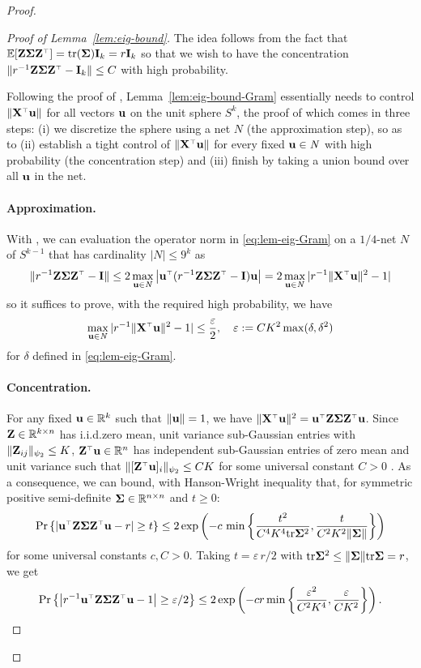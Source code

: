 \documentclass[11pt]{article}
\begin{document}
\begin{proof}
\begin{proof}[Proof of Lemma~\ref{lem:eig-bound}]
The idea follows from the fact that $\E[\Z \Sigmab \Z^\top] = \tr (\Sigmab) \I_k = r \I_k$ so that we wish to have the concentration $\| r^{-1} \Z \Sigmab \Z^\top - \I_k \| \le C$ with high probability.

Following the proof of \cite[Theorem~4.6.1]{vershynin2018high}, Lemma~\ref{lem:eig-bound-Gram} essentially needs to control $\| \X^\top \u \|$ for all vectors $\mathbf u $ on the unit sphere $S^{k}$, the proof of which  comes in three steps: (i) we discretize the sphere using a net $\mathit N$ (the approximation step), so as to (ii) establish a tight control of $\| \X^\top \u \|$ for every fixed $\mathbf u \in \mathit N$ with high probability (the concentration step) and (iii) finish by taking a union bound over all $\mathbf u$ in the net.

\paragraph{Approximation.} With \cite[Corollary~4.2.13]{vershynin2018high}, we can evaluation the operator norm in \eqref{eq:lem-eig-Gram} on a $1/4$-net $\mathit N$ of $S^{k-1} $ that has cardinality $|\mathit N| \le 9^k$ as
\[
  \| r^{-1} \Z \Sigmab \Z^\top - \I \| \le 2 \max_{\u \in \mathit N} \left| \u^\top (r^{-1} \Z \Sigmab \Z^\top - \I) \u \right| = 2 \max_{\u \in \mathit N} | r^{-1} \| \X^\top \u \|^2 - 1 |
\]
so it suffices to prove, with the required high probability, we have
\[
  \max_{\u \in \mathit N} | r^{-1} \| \X^\top \u \|^2 - 1 | \leq \frac{\varepsilon}2, \quad \varepsilon := C K^2  \max(\delta, \delta^2) %
\]
for $\delta$ defined in \eqref{eq:lem-eig-Gram}.

\paragraph{Concentration.} For any fixed $\mathbf u \in \mathbb R^k$ such that $\| \mathbf u \| =1$, we have $\| \X^\top \u \|^2 = \u^\top \Z \Sigmab \Z^\top \u$. Since $\mathbf Z \in \mathbb R^{k \times n}$ has i.i.d.\@ zero mean, unit variance sub-Gaussian entries with $\| \mathbf Z_{ij} \|_{\psi_2} \le K$, $\Z^\top \u \in \R^n$ has independent sub-Gaussian entries of zero mean and unit variance such that $\| [\Z^\top \u]_i \|_{\psi_2} \le C K$ for some universal constant $C > 0$ \cite[Proposition~2.6.1]{vershynin2018high}. As a consequence, we can bound, with Hanson-Wright inequality that, for symmetric positive semi-definite $\mathbf{\Sigma} \in \mathbb R^{n \times n}$ and $t \ge 0$:
\[
  \Pr \left\{ \left| \u^\top \Z \Sigmab \Z^\top \u - r  \right| \ge t \right\} \le 2 \exp \left( - c\,\min \left\{ \frac{t^2}{C^4 K^4 \tr\Sigmab^2 },  \frac{t}{C^2 K^2 \| \Sigmab \| } \right\} \right)
\]
for some universal constants $c, C > 0$. Taking $t = \varepsilon\,r/2$ with $\mathrm{tr} \mathbf{\Sigma}^2 \le \| \mathbf{\Sigma} \| \mathrm{tr} \mathbf{\Sigma} = r$, we get
\begin{equation}
  \Pr \left\{ \left| r^{-1} \u^\top \Z \Sigmab \Z^\top \u - 1  \right| \ge \varepsilon/2 \right\} \le 2 \exp \left( - c r \min \left\{ \frac{ \varepsilon^2 }{C^2 K^4 },  \frac{\varepsilon}{C K^2 } \right\} \right).
\end{equation}


\end{proof}
\end{proof}
\end{document}
